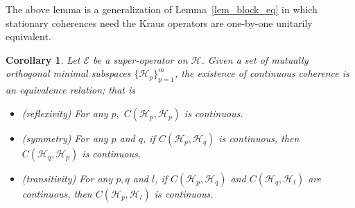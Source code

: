 \documentclass[journal]{IEEEtran}
\def\h{\ensuremath{\mathcal{H}}}
\def\e{\ensuremath{\mathcal{E}}}
\newtheorem{corollary}{Corollary}
\begin{document}
The above lemma is a generalization of Lemma~\ref{lem_block_eq} in which stationary coherences need the Kraus operators are one-by-one unitarily equivalent. 
\begin{corollary}\label{cor_cc_eq}
Let $\e$ be a super-operator on $\h$. 
  Given a set of mutually orthogonal minimal subspaces $\{\h_p\}_{p=1}^{m}$, the existence of continuous coherence is an equivalence relation; that is \begin{itemize}
    \item [(1)] (reflexivity) For any $p,$ $C(\h_p,\h_p)$ is continuous.
    \item [(2)] (symmetry) For any $p$ and $q$, if $C(\h_p,\h_q)$ is continuous, then $C(\h_q,\h_p)$ is continuous.
    \item [(3)] (transitivity) For any $p,q$ and $l$, if $C(\h_p,\h_q)$ and $C(\h_q,\h_l)$ are continuous, then $C(\h_p,\h_l)$ is continuous.
      \end{itemize}
\end{corollary}
\end{document}
